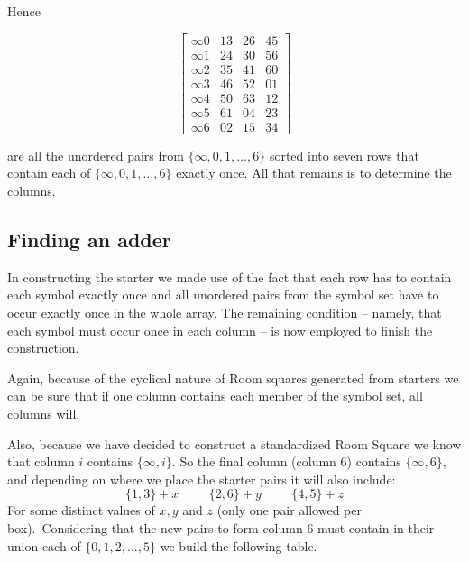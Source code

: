 \documentclass[
  11pt,
  a4paper]{book}
\begin{document}
Hence

\begin{equation}
  \begin{bmatrix}
    \infty 0 &  13 &  26 &  45 \\
    \infty 1 &  24 &  30 &  56 \\
    \infty 2 &  35 &  41 &  60 \\
    \infty 3 &  46 &  52 &  01 \\
    \infty 4 &  50 &  63 &  12 \\
    \infty 5 &  61 &  04 &  23 \\
    \infty 6 &  02 &  15 &  34
  \end{bmatrix}
  \label{eq:starter}
\end{equation}

are all the unordered pairs from \(\{\infty, 0, 1, \ldots, 6\}\)
sorted into seven rows that contain each of
\(\{\infty, 0, 1, \ldots, 6\}\) exactly once. All that remains is to
determine the columns.

\hypertarget{finding-an-adder}{%
\subsection{Finding an adder}\label{finding-an-adder}}

In constructing the starter we made use of the fact that
each row has to contain each symbol exactly once and all
unordered pairs from the symbol set have to occur exactly
once in the whole array. The remaining condition -- namely,
that each symbol must occur once in each column -- is now
employed to finish the construction.

Again, because of the cyclical nature of Room squares
generated from starters we can be sure that if one column
contains each member of the symbol set, all columns will.

Also, because we have decided to construct a standardized
Room Square we know that column \(i\) contains \(\{\infty,i\}\).
So the final column (column 6) contains \(\{\infty,6\}\), and
depending on where we place the starter pairs it will also
include: \[\{1,3\}+x \hspace{1cm} \{2,6\}+y \hspace{1cm}
\{4,5\}+z\] For some distinct values of \(x,y\) and \(z\) (only
one pair allowed per box).~Considering that the new pairs
to form column 6 must contain in their union each of
\(\{0,1,2,...,5\}\) we build the following table.
\end{document}
